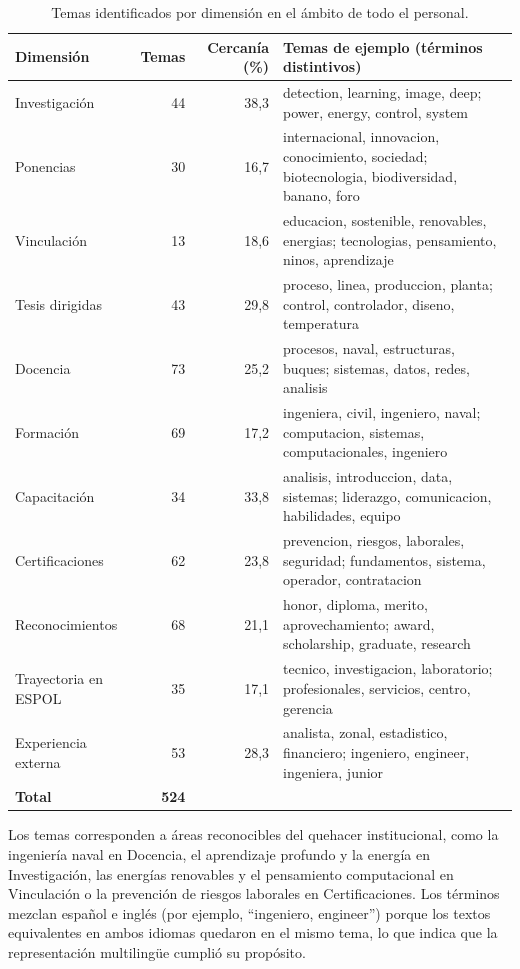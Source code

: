 \begin{table}[!htbp]
    \centering
    \caption{Temas identificados por dimensión en el ámbito de todo el personal.}
    \label{tab:temas}
    \footnotesize
    \begin{tabular}{>{\raggedright\arraybackslash}p{3.1cm} r r >{\raggedright\arraybackslash}p{7.6cm}}
        \toprule
        \textbf{Dimensión} & \textbf{Temas} & \textbf{Cercanía (\%)} & \textbf{Temas de ejemplo (términos distintivos)} \\
        \midrule
        Investigación & 44 & 38,3 & detection, learning, image, deep; power, energy, control, system \\
        Ponencias & 30 & 16,7 & internacional, innovacion, conocimiento, sociedad; biotecnologia, biodiversidad, banano, foro \\
        Vinculación & 13 & 18,6 & educacion, sostenible, renovables, energias; tecnologias, pensamiento, ninos, aprendizaje \\
        Tesis dirigidas & 43 & 29,8 & proceso, linea, produccion, planta; control, controlador, diseno, temperatura \\
        Docencia & 73 & 25,2 & procesos, naval, estructuras, buques; sistemas, datos, redes, analisis \\
        Formación & 69 & 17,2 & ingeniera, civil, ingeniero, naval; computacion, sistemas, computacionales, ingeniero \\
        Capacitación & 34 & 33,8 & analisis, introduccion, data, sistemas; liderazgo, comunicacion, habilidades, equipo \\
        Certificaciones & 62 & 23,8 & prevencion, riesgos, laborales, seguridad; fundamentos, sistema, operador, contratacion \\
        Reconocimientos & 68 & 21,1 & honor, diploma, merito, aprovechamiento; award, scholarship, graduate, research \\
        Trayectoria en ESPOL & 35 & 17,1 & tecnico, investigacion, laboratorio; profesionales, servicios, centro, gerencia \\
        Experiencia externa & 53 & 28,3 & analista, zonal, estadistico, financiero; ingeniero, engineer, ingeniera, junior \\
        \midrule
        \textbf{Total} & \textbf{524} & & \\
        \bottomrule
    \end{tabular}
\end{table}

Los temas corresponden a áreas reconocibles del quehacer institucional, como la ingeniería naval en Docencia, el aprendizaje profundo y la energía en Investigación, las energías renovables y el pensamiento computacional en Vinculación o la prevención de riesgos laborales en Certificaciones. Los términos mezclan español e inglés (por ejemplo, ``ingeniero, engineer'') porque los textos equivalentes en ambos idiomas quedaron en el mismo tema, lo que indica que la representación multilingüe cumplió su propósito.

